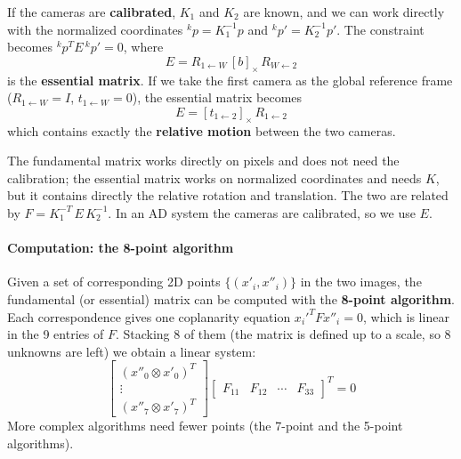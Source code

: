 If the cameras are \textbf{calibrated}, $K_1$ and $K_2$ are known, and we can work directly with the normalized coordinates ${}^k p = K_1^{-1}p$ and ${}^k p' = K_2^{-1}p'$.
The constraint becomes ${}^k p^T E\,{}^k p' = 0$, where
\[
E = R_{1\leftarrow W}\,[b]_\times\,R_{W\leftarrow2}
\]
is the \textbf{essential matrix}.
If we take the first camera as the global reference frame ($R_{1\leftarrow W} = I$, $t_{1\leftarrow W} = 0$), the essential matrix becomes
\[
E = [t_{1\leftarrow2}]_\times\,R_{1\leftarrow2}
\]
which contains exactly the \textbf{relative motion} between the two cameras.

\begin{infobox}[F vs E]
The fundamental matrix works directly on pixels and does not need the calibration; the essential matrix works on normalized coordinates and needs $K$, but it contains directly the relative rotation and translation. The two are related by $F = K_1^{-T}\,E\,K_2^{-1}$. In an AD system the cameras are calibrated, so we use $E$.
\end{infobox}

\paragraph{Computation: the 8-point algorithm}
Given a set of corresponding 2D points $\{(x'_i, x''_i)\}$ in the two images, the fundamental (or essential) matrix can be computed with the \textbf{8-point algorithm}.
Each correspondence gives one coplanarity equation $x_i'^T F x''_i = 0$, which is linear in the 9 entries of $F$.
Stacking 8 of them (the matrix is defined up to a scale, so 8 unknowns are left) we obtain a linear system:
\[
\begin{bmatrix} (x''_0 \otimes x'_0)^T \\ \vdots \\ (x''_7 \otimes x'_7)^T \end{bmatrix}
\begin{bmatrix} F_{11} & F_{12} & \cdots & F_{33} \end{bmatrix}^T = 0
\]
More complex algorithms need fewer points (the 7-point and the 5-point algorithms).

